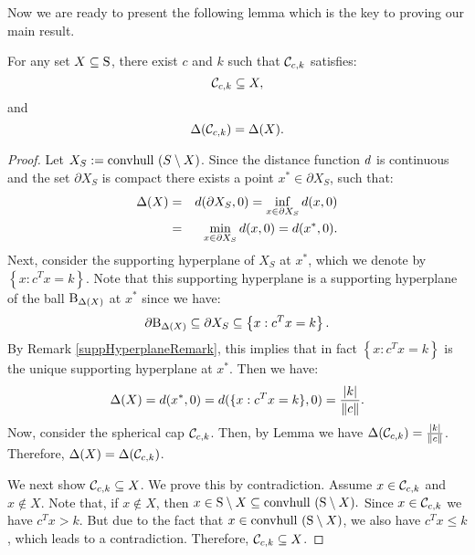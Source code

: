 Now we are ready to present the following lemma which is the key to proving our main result.
\begin{lemma}\label{lemma:constructSC}For any set $X \subseteq \text{S}$, there exist $c$ and $k$ such that $\mathcal{C}_{c,k}$ satisfies:
\begin{equation*}\mathcal{C}_{c,k} \subseteq X,
\end{equation*}
 and
\begin{equation}\Delta(\mathcal{C}_{c,k}) = \Delta(X).
\end{equation}
\end{lemma}

\begin{proof} Let $X_S := \mbox{convhull }(S \setminus X)$.
Since the distance function $d$ is continuous and the set $\partial X_S$ is compact there exists a point $x^* \in \partial X_S$, such that:
\begin{eqnarray}\nonumber \Delta(X) &=& d(\partial X_S, 0) = \inf_{x \in \partial X_S}d(x, 0) \\
\label{deltaSupporting}&=& \min_{x \in \partial X_S}d(x, 0) = d(x^*, 0).\end{eqnarray} 
Next, consider the supporting hyperplane of $X_S$ at $x^*$, which we denote by $\left\{x : c^Tx = k\right\}$. Note that this supporting hyperplane is a supporting hyperplane of the ball $\text{B}_{\Delta(X)}$ at $x^*$ since we have: \begin{equation*} \partial \text{B}_{\Delta(X)} \subseteq \partial X_S \subseteq \left\{x : c^Tx = k\right\}.\end{equation*}  By Remark \ref{suppHyperplaneRemark}, this implies that in fact $\left\{x : c^Tx = k\right\}$ is the unique supporting hyperplane at $x^*$.
Then we have:
\begin{equation*}\Delta(X) =  d(x^*, 0) = d(\{x : c^Tx = k\}, 0) = \frac{|k|}{\|c\|}.
\end{equation*}
Now, consider the spherical cap $\mathcal{C}_{c,k}$. Then, by Lemma \label{lemma:delta2} we have
$\Delta(\mathcal{C}_{c,k}) = \frac{|k|}{\|c\|}$. Therefore, $\Delta(X) = \Delta(\mathcal{C}_{c,k})$.


We next show $\mathcal{C}_{c, k} \subseteq X$. We prove this by contradiction. Assume $x \in \mathcal{C}_{c,k}$ and $x \notin X$. Note that, if $x \notin X$, then $x \in \text{S} \setminus X \subseteq \mbox{convhull }(\text{S} \setminus X).$ Since $x \in \mathcal{C}_{c,k}$ we have $c^Tx>k$. But due to the fact that $x \in \mbox{convhull }(\text{S} \setminus X)$, we also have $c^Tx \leq k$, which leads to a contradiction. Therefore, $\mathcal{C}_{c, k} \subseteq X$. 
\end{proof}

